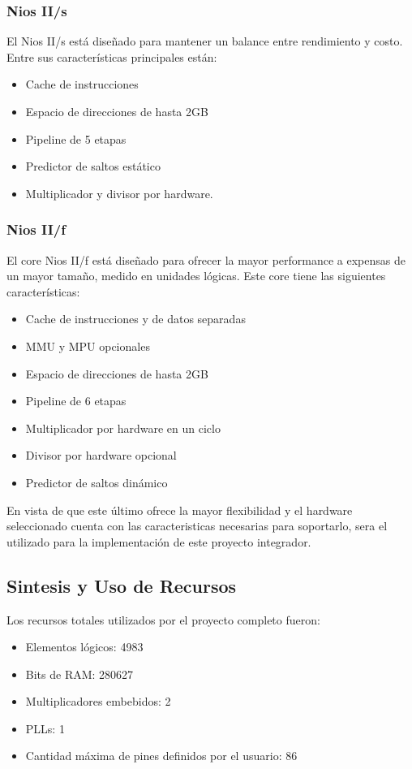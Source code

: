 \subsubsection{Nios II/s}
El Nios II/s está diseñado para mantener un balance entre rendimiento y costo. Entre sus características principales están:

\begin{itemize}
	\item Cache de instrucciones
	\item Espacio de direcciones de hasta 2GB
	\item Pipeline de 5 etapas
	\item Predictor de saltos estático
	\item Multiplicador y divisor por hardware. 
\end{itemize}

\subsubsection{Nios II/f}
El core Nios II/f está diseñado para ofrecer la mayor performance a expensas de un mayor tamaño, medido en unidades lógicas. Este core tiene las siguientes características:

\begin{itemize}
	\item Cache de instrucciones y de datos separadas
	\item MMU y MPU opcionales
	\item Espacio de direcciones de hasta 2GB
	\item Pipeline de 6 etapas
	\item Multiplicador por hardware en un ciclo
	\item Divisor por hardware opcional
	\item Predictor de saltos dinámico
\end{itemize}

En vista de que este último ofrece la mayor flexibilidad y el hardware seleccionado cuenta con las caracteristicas necesarias para soportarlo, sera el utilizado para la implementación de este proyecto integrador.

\subsection{Sintesis y Uso de Recursos}


Los recursos totales utilizados por el proyecto completo fueron:
\begin{itemize}
\item Elementos lógicos: 4983
	\item Bits de RAM: 280627
	\item Multiplicadores embebidos: 2
	\item PLLs: 1
	\item Cantidad máxima de pines definidos por el usuario: 86
\end{itemize}

